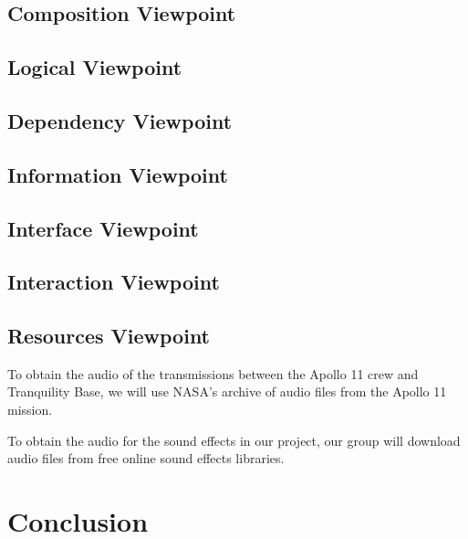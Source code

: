 \documentclass[onecolumn, draftclsnofoot,10pt, compsoc]{IEEEtran}
\begin{document}
    \subsection{Composition Viewpoint}
    
    \subsection{Logical Viewpoint}
    
    \subsection{Dependency Viewpoint}
    
    \subsection{Information Viewpoint}

    \subsection{Interface Viewpoint}
        
    \subsection{Interaction Viewpoint}
    
    \subsection{Resources Viewpoint}
    To obtain the audio of the transmissions between the Apollo 11 crew and Tranquility Base, we will use NASA's archive of audio files from the Apollo 11 mission.
    
    To obtain the audio for the sound effects in our project, our group will download audio files from free online sound effects libraries.


\section{Conclusion}
\end{document}
